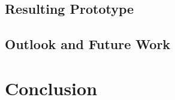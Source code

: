 \section{Resulting Prototype}
\label{p:result}



\section{Outlook and Future Work}
\label{p:outlook}


\chapter{Conclusion}




